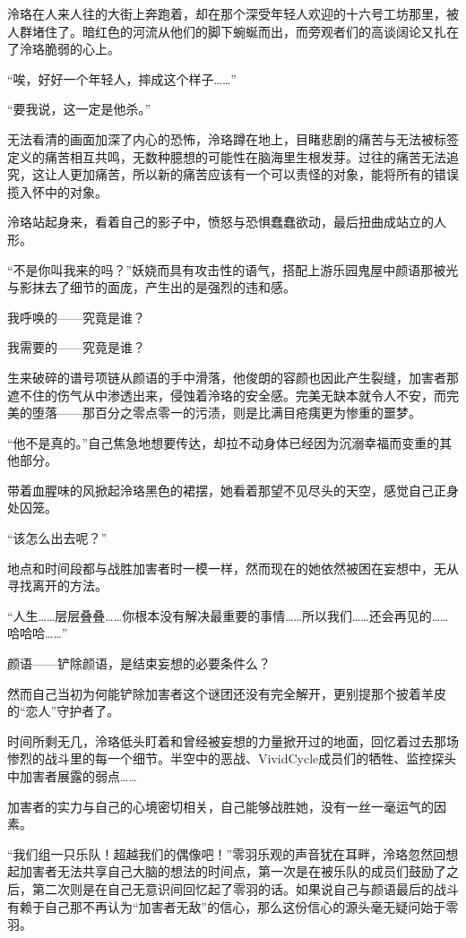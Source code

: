 \documentclass[UTF8, scheme = chinese, openany]{ctexbook}
\begin{document}
泠珞在人来人往的大街上奔跑着，却在那个深受年轻人欢迎的十六号工坊那里，被人群堵住了。暗红色的河流从他们的脚下蜿蜒而出，而旁观者们的高谈阔论又扎在了泠珞脆弱的心上。

“唉，好好一个年轻人，摔成这个样子……”

“要我说，这一定是他杀。”

无法看清的画面加深了内心的恐怖，泠珞蹲在地上，目睹悲剧的痛苦与无法被标签定义的痛苦相互共鸣，无数种臆想的可能性在脑海里生根发芽。过往的痛苦无法追究，这让人更加痛苦，所以新的痛苦应该有一个可以责怪的对象，能将所有的错误揽入怀中的对象。

泠珞站起身来，看着自己的影子中，愤怒与恐惧蠢蠢欲动，最后扭曲成站立的人形。

“不是你叫我来的吗？”妖娆而具有攻击性的语气，搭配上游乐园鬼屋中颜语那被光与影抹去了细节的面庞，产生出的是强烈的违和感。

我呼唤的——究竟是谁？

我需要的——究竟是谁？

生来破碎的谱号项链从颜语的手中滑落，他俊朗的容颜也因此产生裂缝，加害者那遮不住的伤气从中渗透出来，侵蚀着泠珞的安全感。完美无缺本就令人不安，而完美的堕落——那百分之零点零一的污渍，则是比满目疮痍更为惨重的噩梦。

“他不是真的。”自己焦急地想要传达，却拉不动身体已经因为沉溺幸福而变重的其他部分。

带着血腥味的风掀起泠珞黑色的裙摆，她看着那望不见尽头的天空，感觉自己正身处囚笼。

“该怎么出去呢？”

地点和时间段都与战胜加害者时一模一样，然而现在的她依然被困在妄想中，无从寻找离开的方法。

“人生……层层叠叠……你根本没有解决最重要的事情……所以我们……还会再见的……哈哈哈……”

颜语——铲除颜语，是结束妄想的必要条件么？

然而自己当初为何能铲除加害者这个谜团还没有完全解开，更别提那个披着羊皮的“恋人”守护者了。

时间所剩无几，泠珞低头盯着和曾经被妄想的力量掀开过的地面，回忆着过去那场惨烈的战斗里的每一个细节。半空中的恶战、VividCycle成员们的牺牲、监控探头中加害者展露的弱点……

加害者的实力与自己的心境密切相关，自己能够战胜她，没有一丝一毫运气的因素。

“我们组一只乐队！超越我们的偶像吧！”零羽乐观的声音犹在耳畔，泠珞忽然回想起加害者无法共享自己大脑的想法的时间点，第一次是在被乐队的成员们鼓励了之后，第二次则是在自己无意识间回忆起了零羽的话。如果说自己与颜语最后的战斗有赖于自己那不再认为“加害者无敌”的信心，那么这份信心的源头毫无疑问始于零羽。
\end{document}
